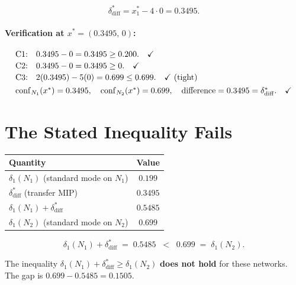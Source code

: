 \documentclass[12pt]{article}
\theoremstyle{definition}
\theoremstyle{plain}
\theoremstyle{remark}
\newcommand{\conf}[2]{\mathrm{conf}_{#1}(#2)}
\newcommand{\dN}[1]{\delta_1(N_{#1})}
\newcommand{\ddiff}{\delta_{\mathrm{diff}}^{*}}
\begin{document}
\[
  \ddiff = x_1^*-4\cdot 0 = \mathbf{0.3495}.
\]

\paragraph{Verification at $x^*=(0.3495,\,0)$:}
\[
\begin{array}{ll}
\text{C1:} & 0.3495-0=0.3495\geq 0.200.\quad\checkmark\\[2pt]
\text{C2:} & 0.3495-0=0.3495\geq 0.\quad\checkmark\\[2pt]
\text{C3:} & 2(0.3495)-5(0)=0.699\leq 0.699.\quad\checkmark\text{ (tight)}\\[4pt]
\multicolumn{2}{l}{\conf{N_1}{x^*}=0.3495,\quad
                   \conf{N_2}{x^*}=0.699,\quad
                   \text{difference}=0.3495=\ddiff.\quad\checkmark}
\end{array}
\]

\section{The Stated Inequality Fails}

\begin{center}
\renewcommand{\arraystretch}{1.5}
\begin{tabular}{lc}
\toprule
Quantity & Value \\
\midrule
$\dN{1}$ (standard mode on $N_1$) & $0.199$ \\
$\ddiff$ (transfer MIP) & $0.3495$ \\
$\dN{1}+\ddiff$ & $\mathbf{0.5485}$ \\
\midrule
$\dN{2}$ (standard mode on $N_2$) & $\mathbf{0.699}$ \\
\bottomrule
\end{tabular}
\end{center}

\bigskip
\[
  \dN{1}+\ddiff
  \;=\; 0.5485
  \;\;\mathbf{<}\;\;
  0.699
  \;=\; \dN{2}.
\]

\noindent
The inequality $\dN{1}+\ddiff\geq\dN{2}$
\textbf{does not hold} for these networks. The gap is
$0.699-0.5485 = 0.1505$.
\end{document}
